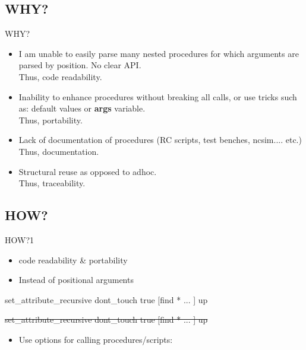 \documentclass[handout]{beamer}
\begin{document}
\subsection{WHY?}
\begin{frame}{WHY?}
	\begin{itemize}[<+->]
	 \item I am unable to easily parse many nested procedures for which arguments are parsed by position. No clear API.\\
	 Thus, \alert{code readability}.
	 \item Inability to enhance procedures without breaking all calls, or use tricks such as: default values or {\bf args} variable. \\
	 Thus, \alert{portability}.
	 \item Lack of documentation of procedures (RC scripts, test benches, ncsim.... etc.)\\
	 Thus, \alert{documentation}.
	 \item Structural reuse as opposed to adhoc.\\
	 Thus, \alert{traceability}.
	 
	\end{itemize}
\end{frame}

\subsection{HOW?}
\begin{frame}[fragile]{HOW?}{1}
	\begin{itemize}
	\item \alert{code readability} \& \alert{portability} \\
	\item<2->{Instead of positional arguments\\}
	\end{itemize}
	\begin{overprint}
		\begin{semiverbatim}
		set\_attribute\_recursive dont\_touch true [find * ... ] up
		\end{semiverbatim}
		\begin{semiverbatim}
		\sout{set_attribute_recursive dont_touch true [find * ... ] up}
		\end{semiverbatim}
	\end{overprint}
	
	\pause
	\begin{itemize}
	\item<3> {Use options for calling procedures/scripts:}
	\end{itemize}
	\begin{semiverbatim}
	\end{semiverbatim}
\end{frame}
\end{document}
